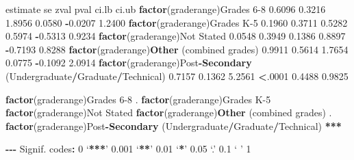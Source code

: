 \documentclass[
]{book}
\newenvironment{Shaded}{\begin{snugshade}}{\end{snugshade}}
\newcommand{\DecValTok}[1]{\textcolor[rgb]{0.00,0.00,0.81}{#1}}
\newcommand{\ErrorTok}[1]{\textcolor[rgb]{0.64,0.00,0.00}{\textbf{#1}}}
\newcommand{\FloatTok}[1]{\textcolor[rgb]{0.00,0.00,0.81}{#1}}
\newcommand{\FunctionTok}[1]{\textcolor[rgb]{0.13,0.29,0.53}{\textbf{#1}}}
\newcommand{\NormalTok}[1]{#1}
\newcommand{\SpecialCharTok}[1]{\textcolor[rgb]{0.81,0.36,0.00}{\textbf{#1}}}
\begin{document}
\begin{Shaded}
\begin{Highlighting}[]
\NormalTok{                                                                     estimate      se    zval    pval    ci.lb   ci.ub }
\FunctionTok{factor}\NormalTok{(graderange)Grades }\DecValTok{6{-}8}                                           \FloatTok{0.6096}  \FloatTok{0.3216}  \FloatTok{1.8956}  \FloatTok{0.0580}  \SpecialCharTok{{-}}\FloatTok{0.0207}  \FloatTok{1.2400} 
\FunctionTok{factor}\NormalTok{(graderange)Grades K}\DecValTok{{-}5}                                           \FloatTok{0.1960}  \FloatTok{0.3711}  \FloatTok{0.5282}  \FloatTok{0.5974}  \SpecialCharTok{{-}}\FloatTok{0.5313}  \FloatTok{0.9234} 
\FunctionTok{factor}\NormalTok{(graderange)Not Stated                                           }\FloatTok{0.0548}  \FloatTok{0.3949}  \FloatTok{0.1386}  \FloatTok{0.8897}  \SpecialCharTok{{-}}\FloatTok{0.7193}  \FloatTok{0.8288} 
\FunctionTok{factor}\NormalTok{(graderange)}\FunctionTok{Other}\NormalTok{ (combined grades)                              }\FloatTok{0.9911}  \FloatTok{0.5614}  \FloatTok{1.7654}  \FloatTok{0.0775}  \SpecialCharTok{{-}}\FloatTok{0.1092}  \FloatTok{2.0914} 
\FunctionTok{factor}\NormalTok{(graderange)Post}\SpecialCharTok{{-}}\FunctionTok{Secondary}\NormalTok{ (Undergraduate}\SpecialCharTok{/}\NormalTok{Graduate}\SpecialCharTok{/}\NormalTok{Technical)    }\FloatTok{0.7157}  \FloatTok{0.1362}  \FloatTok{5.2561}  \SpecialCharTok{\textless{}}\NormalTok{.}\DecValTok{0001}   \FloatTok{0.4488}  \FloatTok{0.9825} 
                                                                         
\FunctionTok{factor}\NormalTok{(graderange)Grades }\DecValTok{6{-}8}\NormalTok{                                           . }
\FunctionTok{factor}\NormalTok{(graderange)Grades K}\DecValTok{{-}5}                                             
\FunctionTok{factor}\NormalTok{(graderange)Not Stated                                             }
\FunctionTok{factor}\NormalTok{(graderange)}\FunctionTok{Other}\NormalTok{ (combined grades)                              . }
\FunctionTok{factor}\NormalTok{(graderange)Post}\SpecialCharTok{{-}}\FunctionTok{Secondary}\NormalTok{ (Undergraduate}\SpecialCharTok{/}\NormalTok{Graduate}\SpecialCharTok{/}\NormalTok{Technical)  }\SpecialCharTok{**}\ErrorTok{*} 

\SpecialCharTok{{-}{-}{-}}
\NormalTok{Signif. codes}\SpecialCharTok{:}  \DecValTok{0}\NormalTok{ ‘}\SpecialCharTok{**}\ErrorTok{*}\NormalTok{’ }\FloatTok{0.001}\NormalTok{ ‘}\SpecialCharTok{**}\NormalTok{’ }\FloatTok{0.01}\NormalTok{ ‘}\SpecialCharTok{*}\NormalTok{’ }\FloatTok{0.05}\NormalTok{ ‘.’ }\FloatTok{0.1}\NormalTok{ ‘ ’ }\DecValTok{1}
\end{Highlighting}
\end{Shaded}
\end{document}

